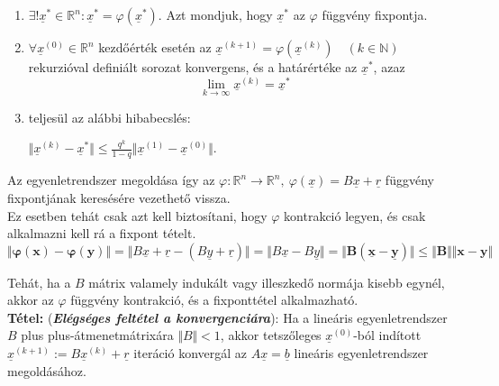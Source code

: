 \documentclass[tikz,12pt,margin=0px]{article}
\newcommand\ddfrac[2]{\frac{\displaystyle #1}{\displaystyle #2}}
\newcommand\lword[1]{\leavevmode\nobreak\hskip0pt plus\linewidth\penalty50\hskip0pt plus-\linewidth\nobreak #1}
\begin{document}
	\begin{enumerate}
		\item $\exists! \underline{x}^{*} \in \mathbb{R}^{n}: \underline{x}^{*} = \varphi(\underline{x}^{*})$. Azt mondjuk, hogy $\underline{x}^{*}$ az $\varphi$ függvény
		fixpontja.
		
        \item $\forall \underline{x}^{(0)} \in \mathbb{R}^{n}$ kezdőérték esetén az $\underline{x}^{(k+1)} = \varphi(\underline{x}^{(k)}) \quad (k \in \mathbb{N})$ rekurzióval definiált sorozat konvergens, és a határértéke az $\underline{x}^{*}$, azaz
        \[
            \lim \limits_{k\to\infty} \underline{x}^{(k)} = \underline{x}^{*}
        \]
		
		\item teljesül az alábbi hibabecslés:
        \begin{center}
    	   $\Vert \underline{x}^{(k)} - \underline{x}^{*}\Vert \leq \ddfrac{q^{k}}{1-q} \Vert \underline{x}^{(1)} - \underline{x}^{(0)}\Vert$.
        \end{center}
	\end{enumerate}
	
    \noindent Az egyenletrendszer megoldása így az $\varphi: \mathbb{R}^{n} \rightarrow \mathbb{R}^{n},\ \varphi(\underline{x}) = B\underline{x} + \underline{r}$ függvény fixpontjának keresésére vezethető vissza.\\

    \noindent Ez esetben tehát csak azt kell biztosítani, hogy $\varphi$ kontrakció legyen, és csak alkalmazni kell rá a fixpont tételt.
    \[
        \boldsymbol{\Vert \varphi(x) - \varphi(y) \Vert} = \Vert B\underline{x} + \underline{r} - (B\underline{y}+\underline{r}) \Vert = \Vert B\underline{x} - B\underline{y} \Vert \boldsymbol{= \Vert B(\underline{x} - \underline{y}) \Vert \leq \Vert B \Vert \Vert x - y \Vert}
    \]

    \noindent Tehát, ha a $B$ mátrix valamely indukált vagy illeszkedő normája kisebb egynél, akkor az $\varphi$ függvény kontrakció, és a fixponttétel alkalmazható.\\
\newpage
    \noindent \textbf{Tétel:} (\textbf{\emph{Elégséges feltétel a konvergenciára}}): Ha a lineáris egyenletrendszer $B$ \lword{átmenetmátrixára} $\Vert B \Vert < 1$, akkor tetszőleges $\underline{x}^{(0)}$-ból indított $\underline{x}^{(k+1)} := B\underline{x}^{(k)} + \underline{r}$ iteráció konvergál az $A\underline{x} = \underline{b}$ lineáris egyenletrendszer megoldásához.\\
\end{document}
